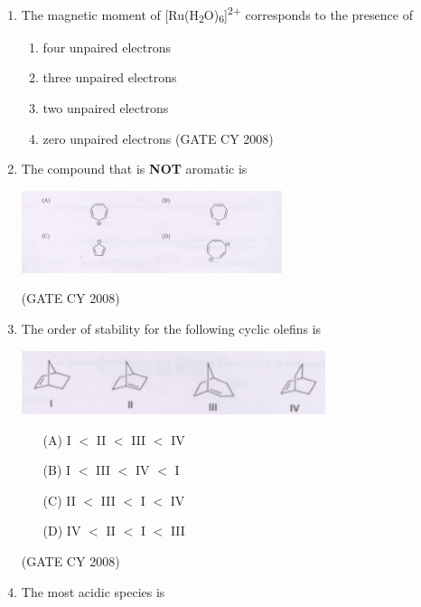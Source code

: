 \documentclass[12pt]{article}
\begin{document}
\begin{enumerate}
    \item The magnetic moment of [Ru(H\textsubscript{2}O)\textsubscript{6}]\textsuperscript{2+} corresponds to the presence of
    \begin{enumerate}
    \item  four unpaired electrons \quad
    \item  three unpaired electrons\quad
    \item  two unpaired electrons \quad
    \item  zero unpaired electrons    \hfill{(GATE CY 2008)}
    \end{enumerate}

    

    \item \quad The compound that is \textbf{NOT} aromatic is

\begin{center}
  \includegraphics[width=0.6\textwidth]{figs/q7.png} 
\end{center}

\bigskip
    \hfill{(GATE CY 2008)}


\item The order of stability for the following cyclic olefins is

\begin{center}
  \includegraphics[width=0.7\textwidth]{figs/q8.png} 
\end{center}

\begin{enumerate}
  \item[(A)] I \(<\) II \(<\) III \(<\) IV
  \item[(B)] I \(<\) III \(<\) IV \(<\) I
  \item[(C)] II \(<\) III \(<\) I \(<\) IV
  \item[(D)] IV \(<\) II \(<\) I \(<\) III
\end{enumerate}    \hfill{(GATE CY 2008)}


\item The most acidic species is


\end{enumerate}
\end{document}
